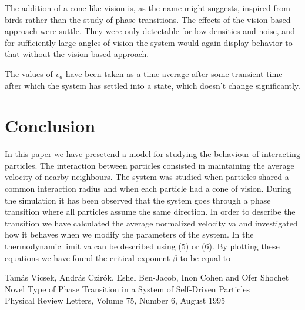 \documentclass[twoside,twocolumn]{article}
\begin{document}
The addition of a cone-like vision is, as the name might suggests, inspired from birds rather than the study of phase transitions.
The effects of the vision based approach were suttle. They were only detectable for low densities and noise, and for
sufficiently large angles of vision the system would again display behavior to that without the vision based approach.

The values of $v_a$ have been taken as a time average after some transient time after which the system has settled into a state, which doesn't change significantly.

\section{Conclusion}

In this paper we have presetend a model for studying the behaviour of interacting particles. The interaction between particles consisted in maintaining the average velocity of nearby neighbours. The system was studied when particles shared a common interaction radius and when each particle had a cone of vision. During the simulation it has been observed that the system goes through a phase transition where all particles assume the same direction. In order to describe the transition we have calculated the average normalized velocity va and investigated how it behaves when we modify the parameters of the system. In the thermodynamic limit va can be described using (5) or (6).
By plotting these equations we have found  the critical exponent $\beta$ to be equal to\todo[inline]{$\beta$}



\begin{thebibliography}{99} %

  Tamás Vicsek, András Czirók, Eshel Ben-Jacob, Inon Cohen and Ofer Shochet\\
  Novel Type of Phase Transition in a System of Self-Driven Particles\\
  Physical Review Letters, Volume 75, Number 6, August 1995
 
\end{thebibliography}

\end{document}
